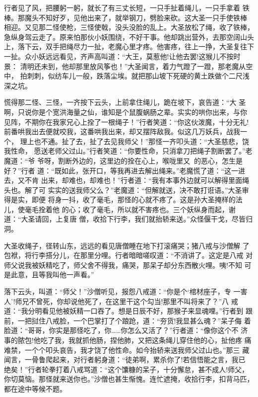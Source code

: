 行者见了风，把腰躬一躬，就长了有三丈长短，一只手扯着绳儿，一只手拿着
铁棒。那魔头不知好歹，见他出来了，就举钢刀，劈脸来砍。这大圣一只手使铁棒
相迎。又见那二怪使枪，三怪使戟，没头没脸的乱上。大圣放松了绳，收了铁棒，
急纵身驾云走了。原来怕那伙小妖围绕，不好干事。他却跳出营外，去那空阔山头
上，落下云，双手把绳尽力一扯，老魔心里才疼。他害疼，往上一挣，大圣复往下
一扯。众小妖远远看见，齐声高叫道：“大王，莫惹他!让他去罢!这猴儿不按时景：
清明还未到，他却那里放风筝也！”大圣闻言，着力气蹬了一蹬，那老魔从空中，
拍刺刺，似纺车儿一般，跌落尘埃。就把那山坡下死硬的黄土跌做个二尺浅深之坑。

慌得那二怪、三怪，一齐按下云头，上前拿住绳儿，跪在坡下，哀告道：“大
圣啊，只说你是个宽洪海量之仙，谁知是个鼠腹蜗肠之辈。实实的哄你出来，与你
见阵，不期你在我家兄心上拴了一根绳子！”行者笑道：“你这伙泼魔，十分无礼!
前番哄我出去便就咬我，这番哄我出来，却又摆阵敌我。似这几万妖兵，战我一个，
理上也不通。扯了去，扯了去见我师父！”那怪一齐叩头道：“大圣慈悲，饶我性命，
愿送老师父过山。”行者笑道：“你要性命，只消拿刀把绳子割断罢了。”老魔道：“爷
爷呀，割断外边的，这里边的拴在心上，喉咙里又的恶心，怎生是好？”行者
道：“既如此，张开口，等我再进去解出绳来。”老魔慌了道：“这一进去，又不肯
出来，却难也，却难也！”行者道：“我有本事外边就可以解得里面绳头也。解了可
实实的送我师父么？”老魔道：“但解就送，决不敢打诳语。”大圣审得是实，即便
将身一抖，收了毫毛，那怪的心就不疼了。这是孙大圣掩样的法儿，使毫毛拴着他
的心；收了毫毛，所以就不害疼也。三个妖纵身而起，谢道：“大圣请回，上复唐
僧，收拾下行李，我们就抬轿来送。”众怪偃干戈，尽皆归洞。

大圣收绳子，径转山东，远远的看见唐僧睡在地下打滚痛哭；猪八戒与沙僧解
了包袱，将行李搭分儿，在那里分哩。行者暗暗嗟叹道：“不消讲了。这定是八戒
对师父说我被妖精吃了，师父舍不得我，痛哭，那呆子却分东西散火哩。咦!不知
可是此意，且等我叫他一声看。”

落下云头，叫道：“师父！”沙僧听见，报怨八戒道：“你是个‘棺材座子，专
一害人’!师兄不曾死，你却说他死了，在这里干这个勾当!那里不叫将来了？”八
戒道：“我分明看见他被妖精一口吞了。想是日辰不好，那猴子来显魂哩。”行者到
跟前，一把挝住八戒脸，一个巴掌打了个踉跄，道：“夯货!我显甚么魂？”呆子侮
着脸道：“哥哥，你实是那怪吃了，你……你怎么又活了？”行者道：“像你这个不
济事的脓包!他吃了我，我就抓他肠，捏他肺，又把这条绳儿穿住他的心，扯他疼
痛难禁，一个个叩头哀告，我才饶了他性命。如今抬轿来送我师父过山也。”那三
藏闻言，一骨鲁爬起来，对行者躬身道：“徒弟啊，累杀你了!若信悟能之言，我已
绝矣！”行者轮拳打着八戒骂道：“这个馕糠的呆子，十分懈怠，甚不成人!师父，
你切莫恼。那怪就来送你也。”沙僧也甚生惭愧。连忙遮掩，收拾行李，扣背马匹，
都在途中等候不题。

